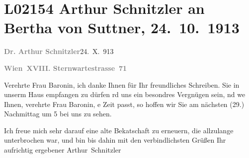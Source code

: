 

\section[Arthur Schnitzler an Bertha von Suttner, 24. 10. 1913]{L02154 Arthur Schnitzler an Bertha von Suttner, 24. 10. 1913}
\nopagebreak{}
\rehead{ }\normalsize\beginnumbering{}
\toendnotes[C]{\smallbreak\pagebreak[2]}
\toendnotes[C]{\smallbreak}
\toendnotes[C]{\smallbreak}
\pstart
           {\pb}\textcolor{gray}{\textbf{Dr. Arthur Schnitzler}}\hfill 24. X. 913\pend
           
\pstart
           \textcolor{gray}{\textbf{Wien XVIII. Sternwartestrasse 71}}\pend
           
\pstart{}Verehrte Frau Baronin,\pend\vspace{0.5em}
\pstart
           ich danke Ihnen für Ihr freundliches Schreiben. Sie in unserm Haus empfangen zu
               dürfen rd uns ein besondres Vergnügen sein, nd we{\geminationn} Ihnen, verehrte Frau Baronin, e Zeit passt, so hoffen wir Sie {\pb}am \introOben{}nächsten\introOben{}{ }\label{K_L02154-1v}\label{K_L02154-1}{ }\introOben{}(29.)\introOben{} Nachmittag um 5 bei uns zu
               sehen.\pend
           
\pstart
           Ich freue mich sehr darauf eine alte Beka{\geminationn}tschaft zu
               erneuern, die allzulange unterbrochen war, und bin bis dahin mit den verbindlichsten
               Grüßen Ihr aufrichtig ergebener\pend
           \pstart \spacefill\mbox{Arthur Schnitzler}\pend{}\endnumbering{}  \newcommand{\dateiname}{L02154}\newcommand{\titel}{Arthur Schnitzler an Bertha von Suttner, 24. 10. 1913}\newcommand{\editorInnen}{Martin Anton Müller und Gerd-Hermann Susen}
